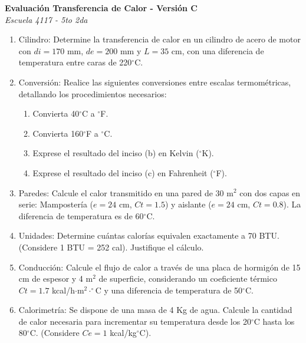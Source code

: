 \documentclass[a4paper,10pt]{article}
\newenvironment{versionexamen}[1]{
  \begin{minipage}[t]{0.48\textwidth}
    \textbf{Evaluación Transferencia de Calor - Versión #1} \\
    \textit{Escuela 4117 - 5to 2da}
    \begin{enumerate}[label=\textbf{\arabic*.}, leftmargin=15pt, topsep=4pt, itemsep=4pt]
      \small
}{
    \end{enumerate}
    \vspace{0.4cm}
  \end{minipage}
}
\begin{document}
\begin{versionexamen}{C}
	\item Cilindro: Determine la transferencia de calor en un cilindro de acero de motor con $di=170$ mm, $de=200$ mm y $L=35$ cm, con una diferencia de temperatura entre caras de 220$^\circ$C.
	\item Conversión: Realice las siguientes conversiones entre escalas termométricas, detallando los procedimientos necesarios:
	\begin{enumerate}[label=\alph*., nosep, leftmargin=15pt]
		\item Convierta 40$^\circ$C a $^\circ$F.
		\item Convierta 160$^\circ$F a $^\circ$C.
		\item Exprese el resultado del inciso (b) en Kelvin ($^\circ$K).
		\item Exprese el resultado del inciso (c) en Fahrenheit ($^\circ$F).
	\end{enumerate}
	\item Paredes: Calcule el calor transmitido en una pared de 30 m$^2$ con dos capas en serie: Mampostería ($e=24$ cm, $Ct=1.5$) y aislante ($e=24$ cm, $Ct=0.8$). La diferencia de temperatura es de 60$^\circ$C.
	\item Unidades: Determine cuántas calorías equivalen exactamente a 70 BTU. (Considere 1 BTU = 252 cal). Justifique el cálculo.
	\item Conducción: Calcule el flujo de calor a través de una placa de hormigón de 15 cm de espesor y 4 m$^2$ de superficie, considerando un coeficiente térmico $Ct=1.7$ kcal/h$\cdot$m$^2\cdot^\circ$C y una diferencia de temperatura de 50$^\circ$C.
	\item Calorimetría: Se dispone de una masa de 4 Kg de agua. Calcule la cantidad de calor necesaria para incrementar su temperatura desde los 20$^\circ$C hasta los 80$^\circ$C. (Considere $Ce=1$ kcal/kg$^\circ$C).
\end{versionexamen}
\hfill
\end{document}
